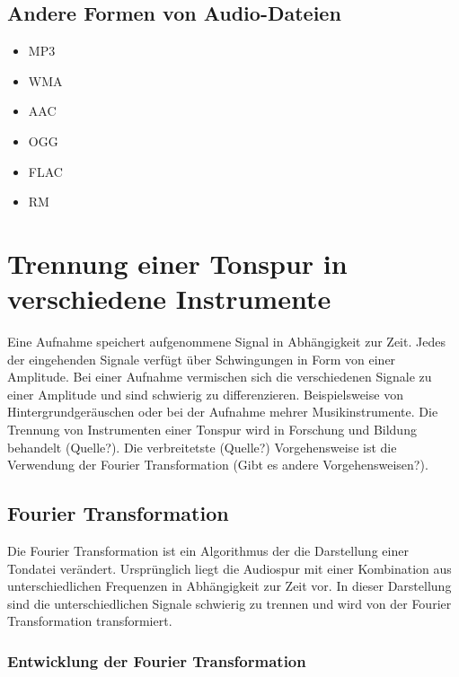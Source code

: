 %
\subsection{Andere Formen von Audio-Dateien}
%

%
\begin{itemize}
    \item MP3
    \item WMA
    \item AAC
    \item OGG
    \item FLAC
    \item RM
\end{itemize}
%

\parencite{audioformate_im_überblick}

%
\section{Trennung einer Tonspur in verschiedene Instrumente}
%

Eine Aufnahme speichert aufgenommene Signal in Abhängigkeit zur Zeit. Jedes der eingehenden Signale verfügt über Schwingungen in Form von einer Amplitude. Bei einer Aufnahme vermischen sich die verschiedenen Signale zu einer Amplitude und sind schwierig zu differenzieren. Beispielsweise von Hintergrundgeräuschen oder bei der Aufnahme mehrer Musikinstrumente. Die Trennung von Instrumenten einer Tonspur wird in Forschung und Bildung behandelt (Quelle?). Die verbreitetste (Quelle?) Vorgehensweise ist die Verwendung der Fourier Transformation (Gibt es andere Vorgehensweisen?).

%
\subsection{Fourier Transformation}
%

Die Fourier Transformation ist ein Algorithmus der die Darstellung einer Tondatei verändert. Ursprünglich liegt die Audiospur mit einer Kombination aus unterschiedlichen Frequenzen in Abhängigkeit zur Zeit vor. In dieser Darstellung sind die unterschiedlichen Signale schwierig zu trennen und wird von der Fourier Transformation transformiert.

\par

%
\subsubsection{Entwicklung der Fourier Transformation}
%

